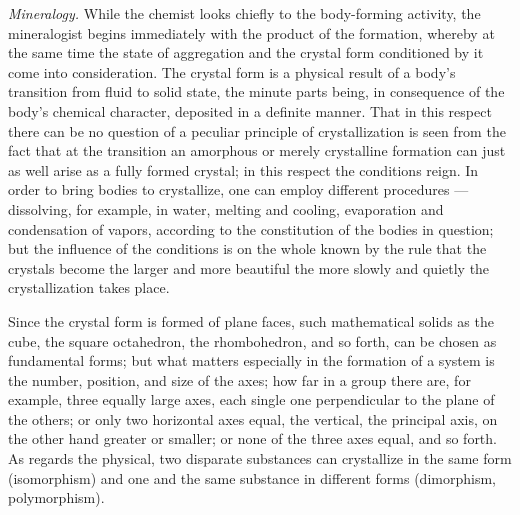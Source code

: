 \documentclass[12pt]{book}
\begin{document}
\emph{Mineralogy.} While the chemist looks chiefly to the body-forming activity, the
mineralogist begins immediately with the product of the formation, whereby at the same
time the state of aggregation and the crystal form conditioned by it come into
consideration. The crystal form is a physical result of a body's transition from
fluid to solid state, the minute parts being, in consequence of the body's chemical
character, deposited in a definite manner. That in this respect there can be no
question of a peculiar principle of crystallization is seen from the fact that at the
transition an amorphous or merely crystalline formation can just as well arise as a
fully formed crystal; in this respect the conditions reign. In order to bring bodies to
crystallize, one can employ different procedures --- dissolving, for example, in water,
melting and cooling, evaporation and condensation of vapors, according to the
constitution of the bodies in question; but the influence of the conditions is on the
whole known by the rule that the crystals become the larger and more beautiful the
more slowly and quietly the crystallization takes place.

Since the crystal form is formed of plane faces, such mathematical solids as the cube,
the square octahedron, the rhombohedron, and so forth, can be chosen as fundamental
forms; but what matters especially in the formation of a system is the number,
position, and size of the axes; how far in a group there are, for example, three
equally large axes, each single one perpendicular to the plane of the others; or only
two horizontal axes equal, the vertical, the principal axis, on the other hand greater
or smaller; or none of the three axes equal, and so forth. As regards the physical, two
disparate substances can crystallize in the same form (isomorphism) and one and the
same substance in different forms (dimorphism, polymorphism).
\end{document}

